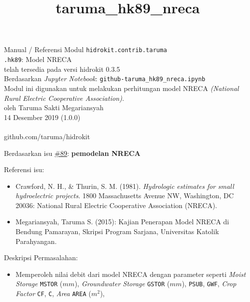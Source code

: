 \documentclass[11pt]{article}
\title{taruma\_hk89\_nreca}
\providecommand{\tightlist}{%
      \setlength{\itemsep}{0pt}\setlength{\parskip}{0pt}}
\begin{document}
  
	\begin{titlepage}
		\vspace*{\fill}
		\begin{center}
 		\normalsize Manual / Referensi Modul \texttt{hidrokit.contrib.taruma}\\
		\huge \texttt{.hk89}: Model NRECA\\ 
		\small telah tersedia pada versi hidrokit 0.3.5 \\[0.2cm]
      	\small Berdasarkan \emph{Jupyter Notebook}: \texttt{github-taruma\_hk89\_nreca.ipynb} \\[0.5cm]
      	\small Modul ini digunakan untuk melakukan perhitungan model NRECA \emph{(National Rural Electric Cooperative Association)}. \\[0.5cm]
		\normalsize oleh Taruma Sakti Megariansyah\\[0.5cm]
      	\normalsize 14 Desember 2019 (1.0.0)\\[1cm]
    	\\
      	\normalsize github.com/taruma/hidrokit
		\end{center}
    	\vspace*{\fill}
	\end{titlepage}
    
    

    
    

    Berdasarkan isu
\href{https://github.com/taruma/hidrokit/issues/89}{\#89}:
\textbf{pemodelan NRECA}

Referensi isu:

\begin{itemize}
\tightlist
\item
  Crawford, N. H., \& Thurin, S. M. (1981). \emph{Hydrologic estimates
  for small hydroelectric projects}. 1800 Massachusetts Avenue NW,
  Washington, DC 20036: National Rural Electric Cooperative Association
  (NRECA).
\item
  Megariansyah, Taruma S. (2015): Kajian Penerapan Model NRECA di
  Bendung Pamarayan, Skripsi Program Sarjana, Universitas Katolik
  Parahyangan.
\end{itemize}

Deskripsi Permasalahan:

\begin{itemize}
\tightlist
\item
  Memperoleh nilai debit dari model NRECA dengan parameter seperti
  \emph{Moist Storage} \texttt{MSTOR} (\(mm\)), \emph{Groundwater
  Storage} \texttt{GSTOR} (\(mm\)), \texttt{PSUB}, \texttt{GWF},
  \emph{Crop Factor} \texttt{CF}, \texttt{C}, \emph{Area} \texttt{AREA}
  (\(m^2\)),
\end{itemize}
\end{document}
